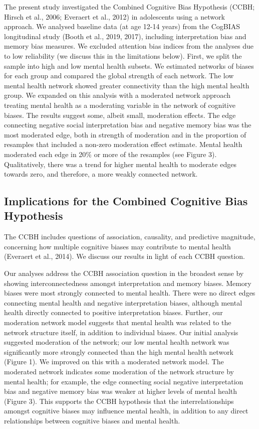 \documentclass[man,floatsintext]{apa6}
\begin{document}
The present study investigated the Combined Cognitive Bias Hypothesis (CCBH; Hirsch et al., 2006; Everaert et al., 2012) in adolescents using a network approach. We analysed baseline data (at age 12-14 years) from the CogBIAS longitudinal study (Booth et al., 2019, 2017), including interpretation bias and memory bias measures. We excluded attention bias indices from the analyses due to low reliability (we discuss this in the limitations below). First, we split the sample into high and low mental health subsets. We estimated networks of biases for each group and compared the global strength of each network. The low mental health network showed greater connectivity than the high mental health group. We expanded on this analysis with a moderated network approach treating mental health as a moderating variable in the network of cognitive biases. The results suggest some, albeit small, moderation effects. The edge connecting negative social interpretation bias and negative memory bias was the most moderated edge, both in strength of moderation and in the proportion of resamples that included a non-zero moderation effect estimate. Mental health moderated each edge in 20\% or more of the resamples (see Figure 3). Qualitatively, there was a trend for higher mental health to moderate edges towards zero, and therefore, a more weakly connected network.

\hypertarget{implications-for-the-combined-cognitive-bias-hypothesis}{%
\subsection{Implications for the Combined Cognitive Bias Hypothesis}\label{implications-for-the-combined-cognitive-bias-hypothesis}}

The CCBH includes questions of association, causality, and predictive magnitude, concerning how multiple cognitive biases may contribute to mental health (Everaert et al., 2014). We discuss our results in light of each CCBH question.

Our analyses address the CCBH association question in the broadest sense by showing interconnectedness amongst interpretation and memory biases. Memory biases were most strongly connected to mental health. There were no direct edges connecting mental health and negative interpretation biases, although mental health directly connected to positive interpretation biases. Further, our moderation network model suggests that mental health was related to the network structure itself, in addition to individual biases. Our initial analysis suggested moderation of the network; our low mental health network was significantly more strongly connected than the high mental health network (Figure 1). We improved on this with a moderated network model. The moderated network indicates some moderation of the network structure by mental health; for example, the edge connecting social negative interpretation bias and negative memory bias was weaker at higher levels of mental health (Figure 3). This supports the CCBH hypothesis that the interrelationships amongst cognitive biases may influence mental health, in addition to any direct relationships between cognitive biases and mental health.
\end{document}
